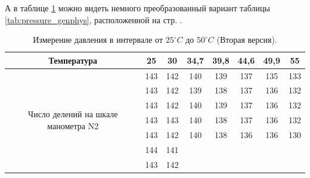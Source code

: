 \documentclass[a4paper,12pt]{article}
\begin{document}
А в таблице \ref{tab:pressure_genphys_2} можно видеть немного преобразованный вариант таблицы \ref{tab:pressure_genphys}, расположенной на стр. \pageref{tab:pressure_genphys}.

\begin{table}[!h]
\caption[Говна кусок]{Измерение давления в интервале от $25^{\circ}C$ до $50^{\circ}C$ (Вторая версия).}\label{tab:pressure_genphys_2}
\begin{tabular}{|c|c|c|ccccc}
\hline
Температура                                            & 25  & 30  & \multicolumn{1}{c|}{34,7} & \multicolumn{1}{c|}{39,8} & \multicolumn{1}{c|}{44,6} & \multicolumn{1}{c|}{49,9} & \multicolumn{1}{c|}{55}  \\ \hline
\multirow{7}{*}{Число   делений на шкале манометра N2} & 143 & 142 & \multicolumn{1}{c|}{140}  & \multicolumn{1}{c|}{139}  & \multicolumn{1}{c|}{137}  & \multicolumn{1}{c|}{135}  & \multicolumn{1}{c|}{133} \\ \cline{2-8} 
                                                       & 143 & 142 & \multicolumn{1}{c|}{139}  & \multicolumn{1}{c|}{138}  & \multicolumn{1}{c|}{137}  & \multicolumn{1}{c|}{136}  & \multicolumn{1}{c|}{132} \\ \cline{2-8} 
                                                       & 143 & 142 & \multicolumn{1}{c|}{140}  & \multicolumn{1}{c|}{139}  & \multicolumn{1}{c|}{137}  & \multicolumn{1}{c|}{136}  & \multicolumn{1}{c|}{132} \\ \cline{2-8} 
                                                       & 143 & 143 & \multicolumn{1}{c|}{140}  & \multicolumn{1}{c|}{138}  & \multicolumn{1}{c|}{137}  & \multicolumn{1}{c|}{136}  & \multicolumn{1}{c|}{132} \\ \cline{2-8} 
                                                       & 143 & 142 & \multicolumn{1}{c|}{140}  & \multicolumn{1}{c|}{138}  & \multicolumn{1}{c|}{136}  & \multicolumn{1}{c|}{136}  & \multicolumn{1}{c|}{130} \\ \cline{2-8} 
                                                       & 144 & 141 &                           &                           &                           &                           &                          \\ \cline{2-3}
                                                       & 143 & 142 &                           &                           &                           &                           &                          \\ \cline{1-3}
\end{tabular}
\end{table}
\end{document}

